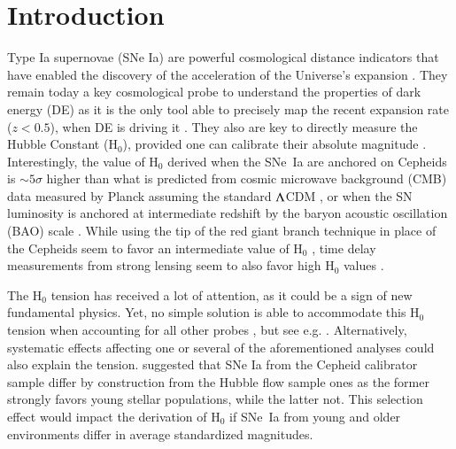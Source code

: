 \documentclass[]{aa} %
\newcommand{\nn}[1]{{\textcolor[rgb]{0.25, 0.50, 0}{#1}}}
\begin{document}
\maketitle

\section{Introduction}

Type Ia supernovae (SNe Ia) are powerful cosmological distance indicators that
have enabled the discovery of the acceleration of the Universe's expansion
\citep{riess1998, perlmutter1999}. They remain today a key cosmological probe to
understand the properties of dark energy (DE) as it is the only tool able to
precisely map the recent expansion rate ($z<0.5$), when DE is driving it
\citep[e.g.][]{scolnicastro2020}. They also are key to directly measure the
Hubble Constant (H$_0$), provided one can calibrate their absolute magnitude
\citep{riess2016, freedman2019}. Interestingly, the value of H$_0$ derived when
the SNe~Ia are anchored on Cepheids \citep[the SH0ES
project,][]{riess2009,riess2016} is $\sim5\sigma$ higher than what is predicted
from cosmic microwave background (CMB) data measured by Planck assuming the
standard $\Lambda$CDM \citep{planck2018,riess2019,reid2019}, or when the SN luminosity is anchored
at intermediate redshift by the baryon acoustic oscillation (BAO) scale \citep{feeney2019}. While using the tip of the
red giant branch technique in place of the Cepheids seem to favor an
intermediate value of H$_0$ \citep{freedman2019,freedman2020}, time delay
measurements from strong lensing seem to also favor high H$_0$ values
\citep{wong2019}.

The H$_0$ tension has received a lot of attention, as it could be a sign of new
fundamental physics. Yet, no simple solution is able to accommodate this H$_0$
tension when accounting for all other probes \citep{knox2019}, but see e.g. \cite{poulin2019}.
Alternatively, systematic effects affecting one or several of the aforementioned
analyses could also explain the tension. \cite{rigault2015} suggested that SNe
Ia from the Cepheid calibrator sample differ by construction from the Hubble
flow \nn{sample} ones as \nn{the former} strongly
favors young stellar population\nn{s}, while the latter not. This selection effect would impact the derivation of H$_0$ if
SNe~Ia from young and older environments differ in average standardized
magnitudes. 
\end{document}
